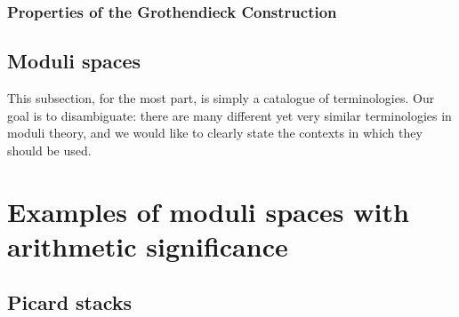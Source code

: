             \subsubsection{Properties of the Grothendieck Construction}
            
        \subsection{Moduli spaces}
            This subsection, for the most part, is simply a catalogue of terminologies. Our goal is to disambiguate: there are many different yet very similar terminologies in moduli theory, and we would like to clearly state the contexts in which they should be used.

    \section{Examples of moduli spaces with arithmetic significance}
        \subsection{Picard stacks}
